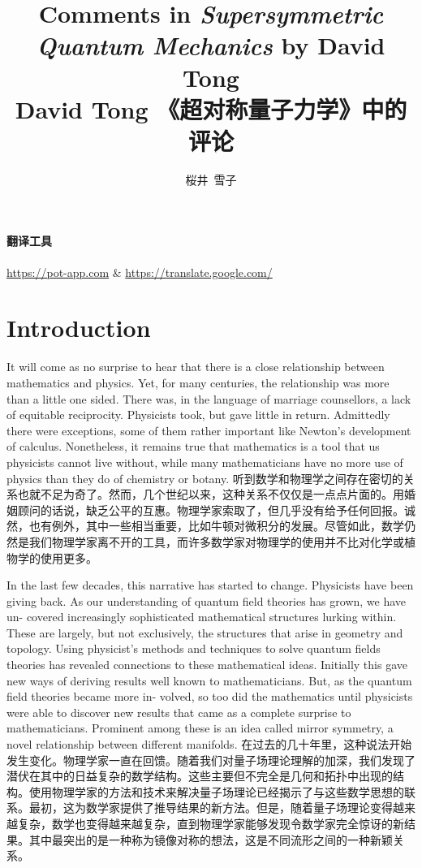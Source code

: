 \documentclass{article}
\title{Comments in \textit{Supersymmetric Quantum Mechanics} by David Tong \\ David Tong 《超对称量子力学》中的评论}
\author{桜井\ 雪子}
\date{}
\begin{document}
\maketitle
\tableofcontents

\paragraph{翻译工具}\url{https://pot-app.com} \& \url{https://translate.google.com/}

\setcounter{section}{-1}
\section{Introduction}

It will come as no surprise to hear that there is a close relationship between mathematics and physics. Yet, for many centuries, the relationship was more than a little one sided. There was, in the language of marriage counsellors, a lack of equitable reciprocity. Physicists took, but gave little in return. Admittedly there were exceptions, some of them rather important like Newton's development of calculus. Nonetheless, it remains true that mathematics is a tool that us physicists cannot live without, while many mathematicians have no more use of physics than they do of chemistry or botany.
听到数学和物理学之间存在密切的关系也就不足为奇了。然而，几个世纪以来，这种关系不仅仅是一点点片面的。用婚姻顾问的话说，缺乏公平的互惠。物理学家索取了，但几乎没有给予任何回报。诚然，也有例外，其中一些相当重要，比如牛顿对微积分的发展。尽管如此，数学仍然是我们物理学家离不开的工具，而许多数学家对物理学的使用并不比对化学或植物学的使用更多。

In the last few decades, this narrative has started to change. Physicists have been giving back. As our understanding of quantum field theories has grown, we have un- covered increasingly sophisticated mathematical structures lurking within. These are largely, but not exclusively, the structures that arise in geometry and topology. Using physicist's methods and techniques to solve quantum fields theories has revealed connections to these mathematical ideas. Initially this gave new ways of deriving results well known to mathematicians. But, as the quantum field theories became more in- volved, so too did the mathematics until physicists were able to discover new results that came as a complete surprise to mathematicians. Prominent among these is an idea called mirror symmetry, a novel relationship between different manifolds.
在过去的几十年里，这种说法开始发生变化。物理学家一直在回馈。随着我们对量子场理论理解的加深，我们发现了潜伏在其中的日益复杂的数学结构。这些主要但不完全是几何和拓扑中出现的结构。使用物理学家的方法和技术来解决量子场理论已经揭示了与这些数学思想的联系。最初，这为数学家提供了推导结果的新方法。但是，随着量子场理论变得越来越复杂，数学也变得越来越复杂，直到物理学家能够发现令数学家完全惊讶的新结果。其中最突出的是一种称为镜像对称的想法，这是不同流形之间的一种新颖关系。
\end{document}
